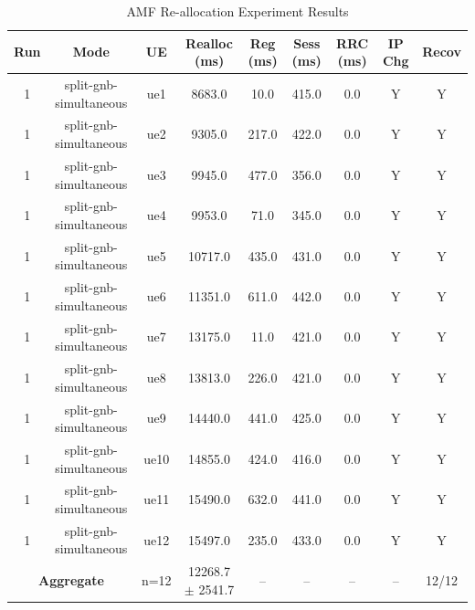 \begin{table}[ht]
\centering
\begin{tabular}{|c|c|c|c|c|c|c|c|c|}
\hline
Run & Mode & UE & Realloc (ms) & Reg (ms) & Sess (ms) & RRC (ms) & IP Chg & Recov \\
\hline
1 & split-gnb-simultaneous & ue1 & 8683.0 & 10.0 & 415.0 & 0.0 & Y & Y \\
1 & split-gnb-simultaneous & ue2 & 9305.0 & 217.0 & 422.0 & 0.0 & Y & Y \\
1 & split-gnb-simultaneous & ue3 & 9945.0 & 477.0 & 356.0 & 0.0 & Y & Y \\
1 & split-gnb-simultaneous & ue4 & 9953.0 & 71.0 & 345.0 & 0.0 & Y & Y \\
1 & split-gnb-simultaneous & ue5 & 10717.0 & 435.0 & 431.0 & 0.0 & Y & Y \\
1 & split-gnb-simultaneous & ue6 & 11351.0 & 611.0 & 442.0 & 0.0 & Y & Y \\
1 & split-gnb-simultaneous & ue7 & 13175.0 & 11.0 & 421.0 & 0.0 & Y & Y \\
1 & split-gnb-simultaneous & ue8 & 13813.0 & 226.0 & 421.0 & 0.0 & Y & Y \\
1 & split-gnb-simultaneous & ue9 & 14440.0 & 441.0 & 425.0 & 0.0 & Y & Y \\
1 & split-gnb-simultaneous & ue10 & 14855.0 & 424.0 & 416.0 & 0.0 & Y & Y \\
1 & split-gnb-simultaneous & ue11 & 15490.0 & 632.0 & 441.0 & 0.0 & Y & Y \\
1 & split-gnb-simultaneous & ue12 & 15497.0 & 235.0 & 433.0 & 0.0 & Y & Y \\
\multicolumn{2}{|c|}{\textbf{Aggregate}} & n=12 & 12268.7 $\pm$ 2541.7 & -- & -- & -- & -- & 12/12 \\
\hline
\end{tabular}
\caption{AMF Re-allocation Experiment Results}
\label{tab:amf_realloc}
\end{table}
